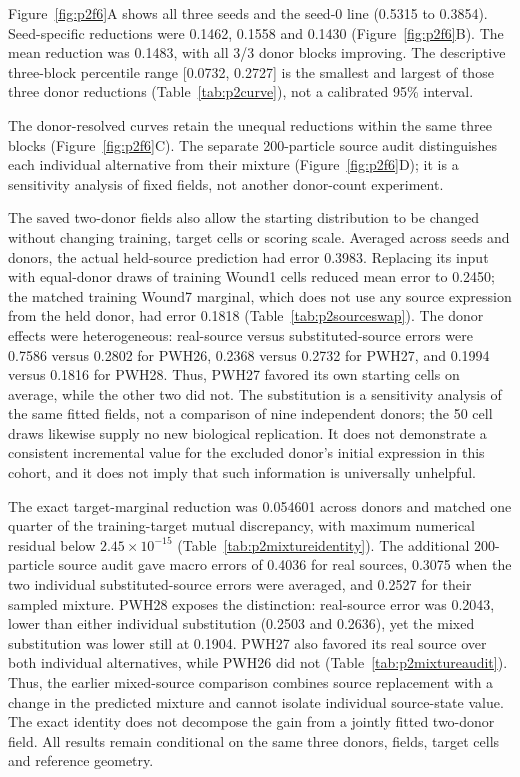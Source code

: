 \documentclass[10pt,a4paper]{article}
\begin{document}
Figure~\ref{fig:p2f6}A\label{call:p2f6} shows all three seeds and the seed-0 line (0.5315 to 0.3854). Seed-specific reductions were 0.1462, 0.1558 and 0.1430 (Figure~\ref{fig:p2f6}B). The mean reduction was 0.1483, with all 3/3 donor blocks improving. The descriptive three-block percentile range {[}0.0732, 0.2727{]} is the smallest and largest of those three donor reductions (Table~\ref{tab:p2curve}), not a calibrated 95\% interval.




The donor-resolved curves retain the unequal reductions within the same three blocks (Figure~\ref{fig:p2f6}C). The separate 200-particle source audit distinguishes each individual alternative from their mixture (Figure~\ref{fig:p2f6}D); it is a sensitivity analysis of fixed fields, not another donor-count experiment.

The saved two-donor fields also allow the starting distribution to be changed without changing training, target cells or scoring scale. Averaged across seeds and donors, the actual held-source prediction had error 0.3983. Replacing its input with equal-donor draws of training Wound1 cells reduced mean error to 0.2450; the matched training Wound7 marginal, which does not use any source expression from the held donor, had error 0.1818 (Table~\ref{tab:p2sourceswap}). The donor effects were heterogeneous: real-source versus substituted-source errors were 0.7586 versus 0.2802 for PWH26, 0.2368 versus 0.2732 for PWH27, and 0.1994 versus 0.1816 for PWH28. Thus, PWH27 favored its own starting cells on average, while the other two did not. The substitution is a sensitivity analysis of the same fitted fields, not a comparison of nine independent donors; the 50 cell draws likewise supply no new biological replication. It does not demonstrate a consistent incremental value for the excluded donor's initial expression in this cohort, and it does not imply that such information is universally unhelpful.

The exact target-marginal reduction was 0.054601 across donors and matched one quarter of the training-target mutual discrepancy, with maximum numerical residual below $2.45\times10^{-15}$ (Table~\ref{tab:p2mixtureidentity}). The additional 200-particle source audit gave macro errors of 0.4036 for real sources, 0.3075 when the two individual substituted-source errors were averaged, and 0.2527 for their sampled mixture. PWH28 exposes the distinction: real-source error was 0.2043, lower than either individual substitution (0.2503 and 0.2636), yet the mixed substitution was lower still at 0.1904. PWH27 also favored its real source over both individual alternatives, while PWH26 did not (Table~\ref{tab:p2mixtureaudit}). Thus, the earlier mixed-source comparison combines source replacement with a change in the predicted mixture and cannot isolate individual source-state value. The exact identity does not decompose the gain from a jointly fitted two-donor field. All results remain conditional on the same three donors, fields, target cells and reference geometry.
\end{document}
